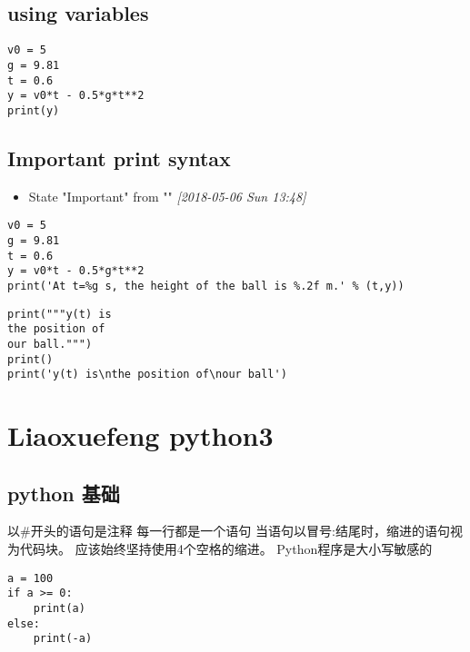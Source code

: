 \documentclass[11pt]{article}
\begin{document}
\subsection{using variables}
\label{sec:orgd8edf9d}
\begin{verbatim}
v0 = 5
g = 9.81
t = 0.6
y = v0*t - 0.5*g*t**2
print(y)
\end{verbatim}
\subsection{{\bfseries\sffamily Important} print syntax}
\label{sec:orgbd7980c}
\begin{itemize}
\item State "Important"  from ""           \textit{[2018-05-06 Sun 13:48]}
\end{itemize}
\begin{verbatim}
v0 = 5
g = 9.81
t = 0.6
y = v0*t - 0.5*g*t**2
print('At t=%g s, the height of the ball is %.2f m.' % (t,y))
\end{verbatim}
\begin{verbatim}
print("""y(t) is
the position of
our ball.""")
print()
print('y(t) is\nthe position of\nour ball')
\end{verbatim}
\section{Liaoxuefeng python3}
\label{sec:orgd73449a}
\subsection{python 基础}
\label{sec:org66aaee2}
以\#开头的语句是注释
每一行都是一个语句
当语句以冒号:结尾时，缩进的语句视为代码块。
应该始终坚持使用4个空格的缩进。
Python程序是大小写敏感的

\begin{verbatim}
a = 100
if a >= 0:
    print(a)
else:
    print(-a)
\end{verbatim}
\end{document}
